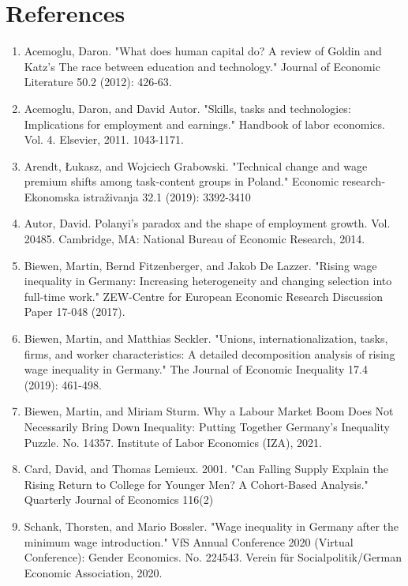 \documentclass{article}
\begin{document}
\section{References}
\begin{enumerate}
\item Acemoglu, Daron. "What does human capital do? A review of Goldin and Katz's The race between education and technology." Journal of Economic Literature 50.2 (2012): 426-63.

\item Acemoglu, Daron, and David Autor. "Skills, tasks and technologies: Implications for employment and earnings." Handbook of labor economics. Vol. 4. Elsevier, 2011. 1043-1171.

\item Arendt, Łukasz, and Wojciech Grabowski. "Technical change and wage premium shifts among task-content groups in Poland." Economic research-Ekonomska istraživanja 32.1 (2019): 3392-3410

\item Autor, David. Polanyi's paradox and the shape of employment growth. Vol. 20485. Cambridge, MA: National Bureau of Economic Research, 2014.

\item Biewen, Martin, Bernd Fitzenberger, and Jakob De Lazzer. "Rising wage inequality in Germany: Increasing heterogeneity and changing selection into full-time work." ZEW-Centre for European Economic Research Discussion Paper 17-048 (2017).

\item Biewen, Martin, and Matthias Seckler. "Unions, internationalization, tasks, firms, and worker characteristics: A detailed decomposition analysis of rising wage inequality in Germany." The Journal of Economic Inequality 17.4 (2019): 461-498.

\item Biewen, Martin, and Miriam Sturm. Why a Labour Market Boom Does Not Necessarily Bring Down Inequality: Putting Together Germany's Inequality Puzzle. No. 14357. Institute of Labor Economics (IZA), 2021.

\item Card, David, and Thomas Lemieux. 2001. "Can Falling Supply Explain the Rising Return to College for Younger Men? A Cohort-Based Analysis." Quarterly Journal of Economics 116(2)

\item Schank, Thorsten, and Mario Bossler. "Wage inequality in Germany after the minimum wage introduction." VfS Annual Conference 2020 (Virtual Conference): Gender Economics. No. 224543. Verein für Socialpolitik/German Economic Association, 2020.


\end{enumerate}
\end{document}

